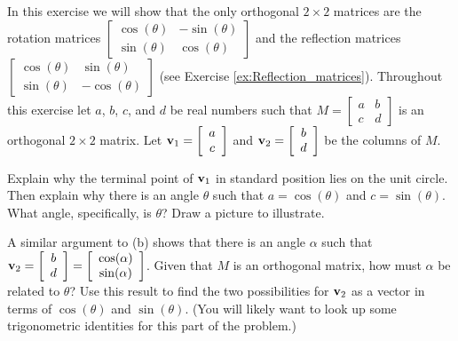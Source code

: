 \item In this exercise we will show that the only orthogonal $2 \times 2$ matrices are the rotation matrices $ \left[ \begin{array}{cr} \cos(\theta)&-\sin(\theta) \\ \sin(\theta)& \cos(\theta) \end{array} \right]$ and the reflection matrices $\left[ \begin{array}{cr} \cos(\theta)&\sin(\theta) \\ \sin(\theta) &-\cos(\theta) \end{array} \right]$ (see Exercise \ref{ex:Reflection_matrices}).  Throughout this exercise let $a$, $b$, $c$, and $d$  be real numbers such that $M = \left[ \begin{array}{cc} a&b \\ c&d \end{array} \right]$ is an orthogonal $2 \times 2$ matrix. Let $\mathbf{v}_1= \left[ \begin{array}{c} a \\ c \end{array} \right]$ and $\mathbf{v}_2= \left[ \begin{array}{c} b \\ d \end{array} \right]$ be the columns of $M$.

\ba

\item  Explain why the terminal point of $\mathbf{v}_1$ in standard position lies on the unit circle. Then explain why there is an angle $\theta$ such that $a = \cos(\theta)$ and $c = \sin(\theta)$. What angle, specifically, is $\theta$? Draw a picture to illustrate. 

\item A similar argument to (b) shows that there is an angle $\alpha$ such that $\mathbf{v}_2 = \left[ \begin{array}{c} b\\d \end{array} \right] = \left[ \begin{array}{c} \cos(\alpha)\\\sin(\alpha) \end{array} \right]$. Given that $M$ is an orthogonal matrix, how must $\alpha$ be related to $\theta$? Use this result to find the two possibilities for $\mathbf{v}_2$ as a vector in terms of $\cos(\theta)$ and $\sin(\theta)$. (You will likely want to look up some trigonometric identities for this part of the problem.)

